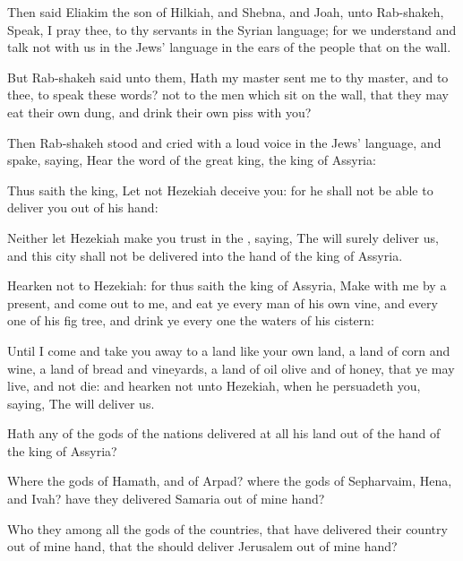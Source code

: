 {Then
said
Eliakim the
son of
Hilkiah, and
Shebna, and
Joah, unto
Rab-shakeh,
Speak, I pray thee, to thy
servants in the Syrian
language; for we
understand
{} and
talk not with us in the
Jews’ language in the
ears of the
people that
{} on the
wall.

But
Rab-shakeh
said unto them, Hath my
master
sent me to thy
master, and to thee, to
speak these
words?
{} not
{} to the
men which
sit on the
wall, that they may
eat their own
dung, and
drink their own
piss with you?

Then
Rab-shakeh
stood and
cried with a
loud
voice in the
Jews’ language, and
spake,
saying,
Hear the
word of the
great
king, the
king of
Assyria:

Thus
saith the
king, Let not
Hezekiah
deceive you: for he shall not be
able to
deliver you out of his
hand:

Neither let
Hezekiah make you
trust in the
{},
saying, The
{} will
surely
deliver us, and this
city shall not be
delivered into the
hand of the
king of
Assyria.

Hearken not to
Hezekiah: for thus
saith the
king of
Assyria,
Make
{} with me by a
present, and come
out to me, and
{}
eat ye every
man of his own
vine, and every
one of his fig
tree, and
drink ye every
one the
waters of his
cistern:

Until I
come and take you
away to a
land like your own
land, a
land of
corn and
wine, a
land of
bread and
vineyards, a
land of
oil
olive and of
honey, that ye may
live, and not
die: and
hearken not unto
Hezekiah, when he
persuadeth you,
saying, The
{} will
deliver us.

Hath
any of the
gods of the
nations
delivered at
all his
land out of the
hand of the
king of
Assyria?

Where
{} the
gods of
Hamath, and of
Arpad? where
{} the
gods of
Sepharvaim,
Hena, and
Ivah? have they
delivered
Samaria out of mine
hand?

Who
{} they among all the
gods of the
countries, that have
delivered their
country out of mine
hand, that the
{} should
deliver
Jerusalem out of mine
hand?

}
